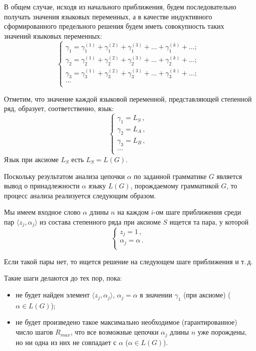 В общем случае, исходя из начального приближения, будем
последовательно получать значения языковых переменных, а в качестве
индуктивного сформированного предельного решения будем иметь
совокупность таких значений языковых переменных:
$$
\begin{cases}
  \gamma_1 = \gamma_1^{(1)} + \gamma_1^{(2)} + \gamma_1^{(3)} + \ldots
  + \gamma_1^{(k)} + \ldots ;\\
  \gamma_2 = \gamma_2^{(1)} + \gamma_2^{(2)} + \gamma_2^{(3)} + \ldots
  + \gamma_2^{(k)} + \ldots ;\\
  \gamma_3 = \gamma_3^{(1)} + \gamma_3^{(2)} + \gamma_3^{(3)} + \ldots
  + \gamma_3^{(k)} + \ldots ;\\
  \ldots\\
\end{cases}
$$

Отметим, что значение каждой языковой переменной, представляющей
степенной ряд, образует, соответственно, язык:
$$
\begin{cases}
  \gamma_1 = L_S\,,\\
  \gamma_2 = L_A\,,\\
  \gamma_3 = L_B\,,\\
  \ldots\\
\end{cases}
$$
Язык при аксиоме $L_S$ есть $L_S = L(G)$.

Поскольку результатом анализа цепочки $\alpha$ по заданной грамматике
$G$ является вывод о принадлежности $\alpha$ языку $L(G)$,
порождаемому грамматикой $G$, то процесс анализа реализуется следующим
образом.

Мы имеем входное слово $\alpha$ длины $n$ на каждом $i$-ом шаге
приближения среди пар $\langle z_j, \alpha_j \rangle$ из состава
степенного ряда при аксиоме $S$ ищется та пара, у которой
$$
\begin{cases}
  z_j = 1\,,\\
  \alpha_j = \alpha\,.\\
\end{cases}
$$

Если такой пары нет, то ищется решение на следующем шаге приближения и
т.\,д.

Такие шаги делаются до тех пор, пока:
\begin{itemize}
\item не будет найден элемент $\langle z_j, \alpha_j \rangle$,
  $\alpha_j = \alpha$ в значении $\gamma_1$ (при аксиоме) ($\alpha \in L(G)$);
\item не будет произведено такое максимально необходимое
  (гарантированное) число шагов $R_{max}$, что все возможные цепочки
  $\alpha_j$ длины $n$ уже порождены, но ни одна из них не совпадает с
  $\alpha$ ($\alpha \in L(G)$).
\end{itemize}

